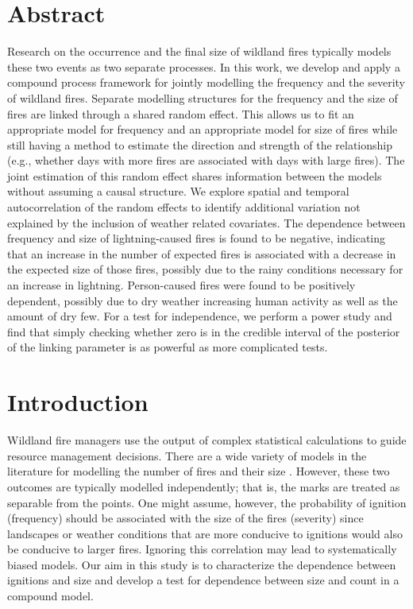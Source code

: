 \documentclass[10pt,letterpaper]{article}
\begin{document}
\section*{Abstract}
Research on the occurrence and the final size of wildland fires typically models these two events as two separate processes. In this work, we develop and apply a compound process framework for jointly modelling the frequency and the severity of wildland fires. Separate modelling structures for the frequency and the size of fires are linked through a shared random effect. This allows us to fit an appropriate model
for frequency and an appropriate model for size of fires while still
having a method to estimate the direction and strength of the
relationship (e.g., whether days with more fires are associated with
days with large fires). The joint estimation of this random effect
shares information between the models without assuming a causal
structure. We explore spatial and temporal autocorrelation of the random
effects to identify additional variation not explained by the inclusion
of weather related covariates. The dependence between frequency and size of lightning-caused fires is found to be negative, indicating that an increase in the number of expected fires is associated with a decrease in the expected size of those fires, possibly due to the rainy conditions necessary for an increase in lightning. Person-caused fires were found to be positively dependent, possibly due to dry weather increasing human activity as well as the amount of dry few. For a test for independence, we perform a power study and find that simply checking whether zero is in the credible interval of the posterior of the linking parameter is as powerful as more complicated tests.



\linenumbers

\section*{Introduction}

Wildland fire managers use the output of complex statistical
calculations to guide resource management decisions. There are a wide variety of models in the literature for modelling the number of fires and their size \cite{taylorWildfirePredictionInform2013}. However, these two outcomes are typically modelled independently; that is, the marks are treated as separable from the points. One might assume, however, the
probability of ignition (frequency) should be associated with the size
of the fires (severity) since landscapes or weather conditions that are more conducive to ignitions would also be conducive to larger fires. Ignoring this correlation may lead to systematically biased models. Our aim in this study is to characterize the
dependence between ignitions and size and develop a test for dependence between size and count in a compound
model.
\end{document}

